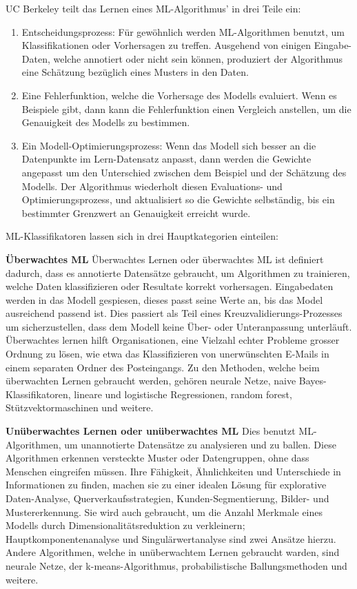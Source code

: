 \begin{lpu}
\begin{artikelbox}
\newpage

UC Berkeley teilt das Lernen eines ML-Algorithmus' in drei Teile ein:
\begin{enumerate}
\item Entscheidungsprozess: Für gewöhnlich werden ML-Algorithmen benutzt, um Klassifikationen oder Vorhersagen zu treffen. Ausgehend von einigen Eingabe-Daten, welche annotiert oder nicht sein können, produziert der Algorithmus eine Schätzung bezüglich eines Musters in den Daten.
\item Eine Fehlerfunktion, welche die Vorhersage des Modells evaluiert. Wenn es Beispiele gibt, dann kann die Fehlerfunktion einen Vergleich anstellen, um die Genauigkeit des Modells zu bestimmen.
\item Ein Modell-Optimierungsprozess: Wenn das Modell sich besser an die Datenpunkte im Lern-Datensatz anpasst, dann werden die Gewichte angepasst um den Unterschied zwischen dem Beispiel und der Schätzung des Modells. Der Algorithmus wiederholt diesen Evaluations- und Optimierungsprozess, und aktualisiert so die Gewichte selbständig, bis ein bestimmter Grenzwert an Genauigkeit erreicht wurde.
\end{enumerate}

ML-Klassifikatoren lassen sich in drei Hauptkategorien einteilen:

\textbf{Überwachtes ML}
Überwachtes Lernen oder überwachtes ML ist definiert dadurch, dass es annotierte Datensätze gebraucht, um Algorithmen zu trainieren, welche Daten klassifizieren oder Resultate korrekt vorhersagen. Eingabedaten werden in das Modell gespiesen, dieses passt seine Werte an, bis das Model ausreichend passend ist. Dies passiert als Teil eines Kreuzvalidierungs-Prozesses um sicherzustellen, dass dem Modell keine Über- oder Unteranpassung unterläuft. Überwachtes lernen hilft Organisationen, eine Vielzahl echter Probleme grosser Ordnung zu lösen, wie etwa das Klassifizieren von unerwünschten E-Mails in einem separaten Ordner des Posteingangs. Zu den Methoden, welche beim überwachten Lernen gebraucht werden, gehören neurale Netze, naive Bayes-Klassifikatoren, lineare und logistische Regressionen, random forest, Stützvektormaschinen und weitere.


\textbf{Unüberwachtes Lernen oder unüberwachtes ML}
Dies benutzt ML-Algorithmen, um unannotierte Datensätze zu analysieren und zu ballen. Diese Algorithmen erkennen versteckte Muster oder Datengruppen, ohne dass Menschen eingreifen müssen. Ihre Fähigkeit, Ähnlichkeiten und Unterschiede in Informationen zu finden, machen sie zu einer idealen Lösung für explorative Daten-Analyse, Querverkaufsstrategien, Kunden-Segmentierung, Bilder- und Mustererkennung. Sie wird auch gebraucht, um die Anzahl Merkmale eines Modells durch Dimensionalitätsreduktion zu verkleinern; Hauptkomponentenanalyse und Singulärwertanalyse sind zwei Ansätze hierzu. Andere Algorithmen, welche in unüberwachtem Lernen gebraucht warden, sind neurale Netze, der k-means-Algorithmus, probabilistische Ballungsmethoden und weitere.


\end{artikelbox}
\end{lpu}
